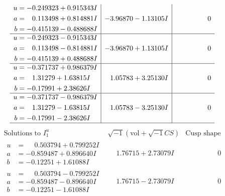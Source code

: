 \documentclass[1p]{elsarticle_modified}
\theoremstyle{definition}
\newcommand{\I}{\sqrt{-1}}
\begin{document}
$$\begin{array}{c|c|c}
\begin{aligned}
u &= -0.249323 + 0.915343 I \\
a &= \phantom{-}0.113498 + 0.814881 I \\
b &= -0.415139 - 0.488688 I\end{aligned}
 & -3.96870 - 1.13105 I & \phantom{-0.000000 } 0 \\ \hline\begin{aligned}
u &= -0.249323 - 0.915343 I \\
a &= \phantom{-}0.113498 - 0.814881 I \\
b &= -0.415139 + 0.488688 I\end{aligned}
 & -3.96870 + 1.13105 I & \phantom{-0.000000 } 0 \\ \hline\begin{aligned}
u &= -0.371737 + 0.986379 I \\
a &= \phantom{-}1.31279 + 1.63815 I \\
b &= -0.17991 + 2.38626 I\end{aligned}
 & \phantom{-}1.05783 + 3.25130 I & \phantom{-0.000000 } 0 \\ \hline\begin{aligned}
u &= -0.371737 - 0.986379 I \\
a &= \phantom{-}1.31279 - 1.63815 I \\
b &= -0.17991 - 2.38626 I\end{aligned}
 & \phantom{-}1.05783 - 3.25130 I & \phantom{-0.000000 } 0\\
 \hline 
 \end{array}$$\newpage$$\begin{array}{c|c|c}  
\text{Solutions to }I^u_{1}& \I (\text{vol} + \sqrt{-1}CS) & \text{Cusp shape}\\
 \hline 
\begin{aligned}
u &= \phantom{-}0.503794 + 0.799252 I \\
a &= -0.859487 + 0.896640 I \\
b &= -0.12251 + 1.61088 I\end{aligned}
 & \phantom{-}1.76715 + 2.73079 I & \phantom{-0.000000 } 0 \\ \hline\begin{aligned}
u &= \phantom{-}0.503794 - 0.799252 I \\
a &= -0.859487 - 0.896640 I \\
b &= -0.12251 - 1.61088 I\end{aligned}
 & \phantom{-}1.76715 - 2.73079 I & \phantom{-0.000000 } 0 \\ \hline\begin{aligned}

\end{aligned}
\end{array}$$
\end{document}
